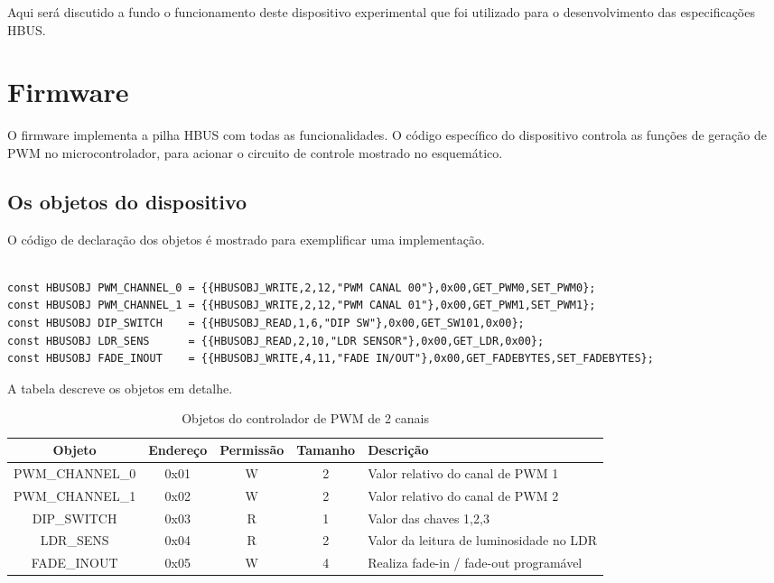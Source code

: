\documentclass[11pt]{report}
\begin{document}
Aqui será discutido a fundo o funcionamento deste dispositivo experimental que foi utilizado para o desenvolvimento das especificações HBUS.

\section{Firmware}

O firmware implementa a pilha HBUS com todas as funcionalidades. O código específico do dispositivo controla as funções de geração de PWM no microcontrolador, para acionar o circuito de controle mostrado no esquemático.

\subsection{Os objetos do dispositivo}

O código de declaração dos objetos é mostrado para exemplificar uma implementação.

\begin{verbatim}

const HBUSOBJ PWM_CHANNEL_0 = {{HBUSOBJ_WRITE,2,12,"PWM CANAL 00"},0x00,GET_PWM0,SET_PWM0};
const HBUSOBJ PWM_CHANNEL_1 = {{HBUSOBJ_WRITE,2,12,"PWM CANAL 01"},0x00,GET_PWM1,SET_PWM1};
const HBUSOBJ DIP_SWITCH    = {{HBUSOBJ_READ,1,6,"DIP SW"},0x00,GET_SW101,0x00};
const HBUSOBJ LDR_SENS      = {{HBUSOBJ_READ,2,10,"LDR SENSOR"},0x00,GET_LDR,0x00};
const HBUSOBJ FADE_INOUT	= {{HBUSOBJ_WRITE,4,11,"FADE IN/OUT"},0x00,GET_FADEBYTES,SET_FADEBYTES};

\end{verbatim}

A tabela descreve os objetos em detalhe.

\begin{table}[H]
\centering
\caption{Objetos do controlador de PWM de 2 canais}
\begin{tabular}{c c c c p{6cm}}
\hline
Objeto			&	Endereço		&	Permissão	&	Tamanho	& Descrição\\
\hline
PWM\_CHANNEL\_0	&	0x01			&	W			&	2		& Valor relativo do canal de PWM 1\\
PWM\_CHANNEL\_1 &	0x02			&	W			&	2		& Valor relativo do canal de PWM 2\\
DIP\_SWITCH		&	0x03			&	R			&	1		& Valor das chaves 1,2,3\\
LDR\_SENS		&	0x04			&	R			&	2		& Valor da leitura de luminosidade no LDR\\
FADE\_INOUT		&	0x05			&	W			&	4		& Realiza fade-in / fade-out programável\\
\hline
\end{tabular}
\end{table}
\end{document}
